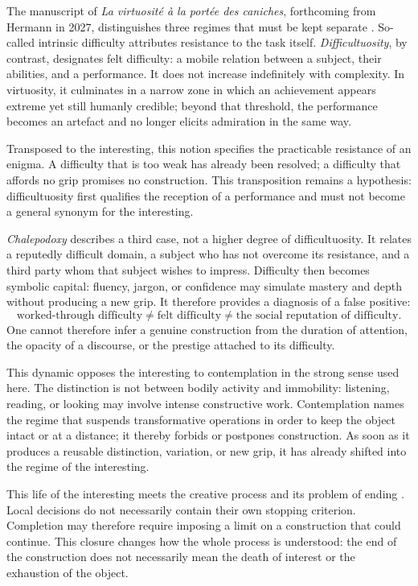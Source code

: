 \documentclass[11pt,a4paper]{article}
\begin{document}
The manuscript of \emph{La virtuosité à la portée des caniches}, forthcoming
from Hermann in 2027, distinguishes three regimes that must be kept separate
\parencite[manuscript, 13--16]{pachet2027virtuosite}. So-called intrinsic
difficulty attributes resistance to the task itself. \emph{Difficultuosity}, by
contrast, designates felt difficulty: a mobile relation between a subject,
their abilities, and a performance. It does not increase indefinitely with
complexity. In virtuosity, it culminates in a narrow zone in which an
achievement appears extreme yet still humanly credible; beyond that threshold,
the performance becomes an artefact and no longer elicits admiration in the
same way.

Transposed to the interesting, this notion specifies the practicable resistance
of an enigma. A difficulty that is too weak has already been resolved; a
difficulty that affords no grip promises no construction. This transposition
remains a hypothesis: difficultuosity first qualifies the reception of a
performance and must not become a general synonym for the interesting.

\emph{Chalepodoxy} describes a third case, not a higher degree of
difficultuosity. It relates a reputedly difficult domain, a subject who has not
overcome its resistance, and a third party whom that subject wishes to impress.
Difficulty then becomes symbolic capital: fluency, jargon, or confidence may
simulate mastery and depth without producing a new grip. It therefore provides
a diagnosis of a false positive:
\[
  \text{worked-through difficulty}
  \neq \text{felt difficulty}
  \neq \text{the social reputation of difficulty}.
\]
One cannot therefore infer a genuine construction from the duration of
attention, the opacity of a discourse, or the prestige attached to its
difficulty.

This dynamic opposes the interesting to contemplation in the strong sense used
here. The distinction is not between bodily activity and immobility: listening,
reading, or looking may involve intense constructive work. Contemplation names
the regime that suspends transformative operations in order to keep the object
intact or at a distance; it thereby forbids or postpones construction. As soon
as it produces a reusable distinction, variation, or new grip, it has already
shifted into the regime of the interesting.

This life of the interesting meets the creative process and its problem of
ending \parencite{pachet2026impossibilite}. Local decisions do not necessarily
contain their own stopping criterion. Completion may therefore require imposing
a limit on a construction that could continue. This closure changes how the
whole process is understood: the end of the construction does not
necessarily mean the death of interest or the exhaustion of the object.
\end{document}
